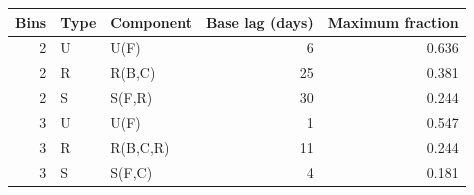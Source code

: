 \begin{tabular}{rllrr}
\toprule
Bins & Type & Component & Base lag (days) & Maximum fraction \\
\midrule
2 & U & U(F) & 6 & 0.636 \\
2 & R & R(B,C) & 25 & 0.381 \\
2 & S & S(F,R) & 30 & 0.244 \\
3 & U & U(F) & 1 & 0.547 \\
3 & R & R(B,C,R) & 11 & 0.244 \\
3 & S & S(F,C) & 4 & 0.181 \\
\bottomrule
\end{tabular}
